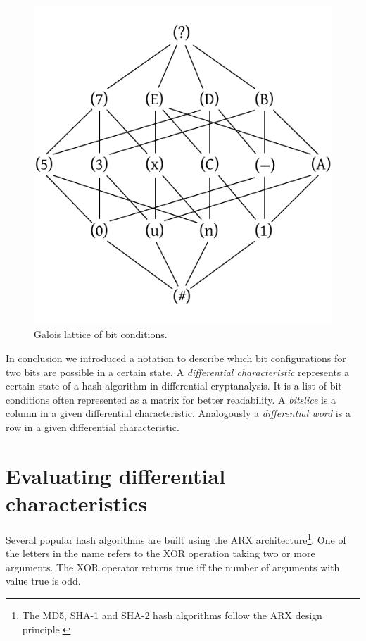 \begin{figure}[p]
 \begin{center}
  \includegraphics{img/bit_condition_lattice.pdf}
  \caption{Galois lattice of bit conditions.}
  \label{fig:bitconditions-lattice}
 \end{center}
\end{figure}

In conclusion we introduced a notation to describe which bit configurations for two bits are possible in a certain state. A \emph{differential characteristic} represents a certain state of a hash algorithm in differential cryptanalysis. It is a list of bit conditions often represented as a matrix for better readability. A \emph{bitslice} is a column in a given differential characteristic. Analogously a \emph{differential word} is a row in a given differential characteristic.

\section{Evaluating differential characteristics}
\label{sec:diffchar-examples}
%
Several popular hash algorithms are built using the ARX architecture\footnote{The MD5, SHA-1 and SHA-2 hash algorithms follow the ARX design principle.}. One of the letters in the name refers to the XOR operation taking two or more arguments. The XOR operator returns true iff the number of arguments with value true is odd.


